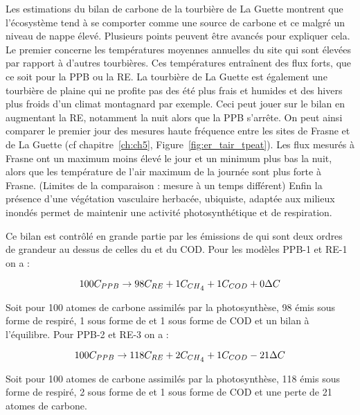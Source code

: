 Les estimations du bilan de carbone de la tourbière de La Guette montrent que l'écosystème tend à se comporter comme une source de carbone et ce malgré un niveau de nappe élevé.
Plusieurs points peuvent être avancés pour expliquer cela.
Le premier concerne les températures moyennes annuelles du site qui sont élevées par rapport à d'autres tourbières.
Ces températures entraînent des flux forts, que ce soit pour la PPB ou la RE.
La tourbière de La Guette est également une tourbière de plaine qui ne profite pas des été plus frais et humides et des hivers plus froids d'un climat montagnard par exemple.
Ceci peut jouer sur le bilan en augmentant la RE, notamment la nuit alors que la PPB s'arrête.
On peut ainsi comparer le premier jour des mesures haute fréquence entre les sites de Frasne et de La Guette (cf chapitre~\ref{ch:ch5}, Figure~\ref{fig:er_tair_tpeat}).
Les flux mesurés à Frasne ont un maximum moins élevé le jour et un minimum plus bas la nuit, alors que les température de l'air maximum de la journée sont plus forte à Frasne.
(Limites de la comparaison : mesure à un temps différent)
Enfin la présence d'une végétation vasculaire herbacée, ubiquiste, adaptée aux milieux inondés permet de maintenir une activité photosynthétique et de respiration.

Ce bilan est contrôlé en grande partie par les émissions de \coo qui sont deux ordres de grandeur au dessus de celles du \chh et du COD.
Pour les modèles PPB-1 et RE-1 on a :

\begin{equation}
100C_{PPB} \rightarrow 98C_{RE} + 1C_{CH\textsubscript{4}} + 1C_{COD} + 0\Delta C
\end{equation}

Soit pour 100 atomes de carbone assimilés par la photosynthèse, 98 émis sous forme de \coo respiré, 1 sous forme de \chh et 1 sous forme de COD et un bilan à l'équilibre.
Pour PPB-2 et RE-3 on a :

\begin{equation}
100C_{PPB} \rightarrow 118C_{RE} + 2C_{CH\textsubscript{4}} + 1C_{COD} -21\Delta C
\end{equation}

Soit pour 100 atomes de carbone assimilés par la photosynthèse, 118 émis sous forme de \coo respiré, 2 sous forme de \chh et 1 sous forme de COD et une perte de 21 atomes de carbone.

